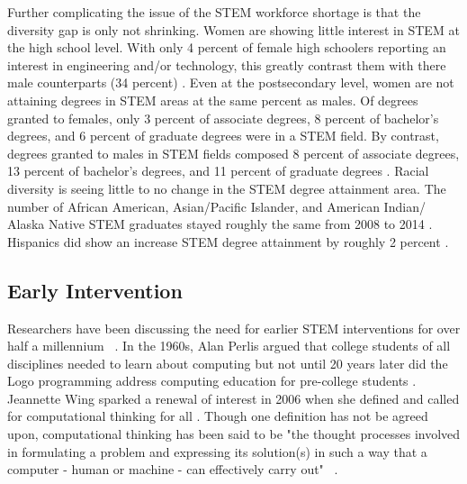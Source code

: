 \documentclass[11pt, letterpaper, onecolumn]{article}
\begin{document}
 
%
Further complicating the issue of the STEM workforce shortage is that the diversity gap is only not shrinking.
%
Women are showing little interest in STEM at the high school level.
%
With only 4 percent of female high schoolers reporting an interest in engineering and/or technology, this greatly contrast them with there male counterparts (34 percent) . 
%
Even at the postsecondary level, women are not attaining degrees in STEM areas at the same percent as males.
%
Of degrees granted to females, only 3 percent of associate degrees, 8 percent of bachelor's degrees, and 6 percent of graduate degrees were in a STEM field. 
%
By contrast, degrees granted to males in STEM fields composed 8 percent of associate degrees, 13 percent of bachelor's degrees, and 11 percent of graduate degrees \cite{stemindex2017}.
%
Racial diversity is seeing little to no change in the STEM degree attainment area.
%
The number of African American, Asian/Pacific Islander, and American Indian/ Alaska Native STEM graduates stayed roughly the same from 2008 to 2014 .
%
Hispanics did show an increase STEM degree attainment by roughly 2 percent \cite{nces2015des}.

\subsection{Early Intervention}

%
Researchers have been discussing the need for earlier STEM interventions for over half a millennium ~\cite{Wing2006CommACM,Barr2011ACMInroads,Guzdial2008CommACM,Barr2011LLT,bhef2014}.
%
In the 1960s,  Alan Perlis argued that college students of all disciplines needed to learn about computing but not until 20 years later did the Logo programming address computing education for pre-college students \cite{Grover2013EduResearcher}.
%
Jeannette Wing sparked a renewal of interest in 2006 when she defined and called for computational thinking for all \cite{Wing2006CommACM}.
%
Though one definition has not be agreed upon, computational thinking has been said to be "the thought processes involved in formulating a problem and expressing its solution(s) in such a way that a computer -  human or machine -  can effectively carry out" ~\cite{wing2014computational}.
%
\end{document}
